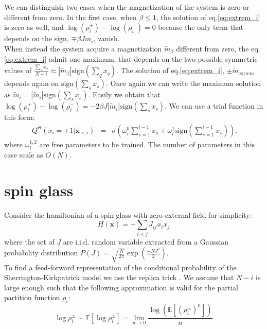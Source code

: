 \documentclass[aps,physrev,10pt,floatfix,longbibliography,nofootinbib,reprint]{revtex4-2}
\begin{document}
We can distinguish two cases when the magnetization of the system is zero or different from zero. 
In the first case, when $\beta\leq1$, the solution of eq.\ref{eq:extrem_i} is zero as well, and $\log(\rho_i^{+}) - \log(\rho_i^{-})=0$ because the only term that depends on the sign, $\mp \beta J m_i$, vanish.\\ 
When instead the system acquire a magnetization $\tilde{m}_{\beta}$ different from zero, the eq.\ref{eq:extrem_i} admit one maximum, that depends on the two possible symmetric values of $\frac{\sum_s x_s}{N-i}\approx |\tilde{m}_{\beta}| \text{sign}(\sum_q x_q)$. 
The solution of eq.\ref{eq:extrem_i}, $\pm \tilde{m}_{\text{extrem}}$ depends again on $\text{sign}(\sum_s x_s)$. 
Once again we can write the maximum solution as $\tilde{m}_{i}=|\tilde{m}_i| \text{sign}(\sum_s x_s)$. 
Easily we obtain that $\log(\rho_i^{+}) - \log(\rho_i^{-}) = -2\beta J|\tilde{m}_i| \text{sign}(\sum_s x_s)$. 
We can use a trial function in this form:
\begin{eqnarray}\
\label{eq:curie_weiss_cond2}
Q^{\Theta}\left(x_{i}=+1|\mathbf{x}_{<i}\right) & = & \sigma \left(\omega_{i}^0\sum_{s=1}^{i-1}x_{s} + \omega_i^1 \text{sign}(\sum_{s=1}^{i-1}x_{s})\right).
\end{eqnarray}
where $\omega_i^{1,2}$ are free parameters to be trained. The number of parameters in this case scale as $O(N)$.

\section{spin glass}
Consider the hamiltonian of a spin glass with zero external field for simplicity:
\begin{equation}
H\left(\mathbf{x}\right)=-\sum_{i<j}J_{ij}x_{i}x_{j}
\end{equation}
where the set of $\underline{J}$ are i.i.d. random variable extracted from a Gaussian probability distribution $P(J)=\sqrt{\frac{N}{2\pi}}\exp\left(\frac{-NJ^2}{2} \right)$. \\
To find a feed-forward representation of the conditional probability of the Sherrington-Kirkpatrick model we use the replica trick \cite{}. We assume that $N-i$ is large enough such that the following approximation is valid for the partial partition function $\rho_i$: 
\[
\log\rho_i^{\pm} \sim \mathbb{E}\left[  \log\rho_i^{\pm} \right] = \lim_{n\rightarrow 0} \frac{  \log(\mathbb{E}\left[(\rho_i^{\pm})^n \right])}{n}
\]
\end{document}
